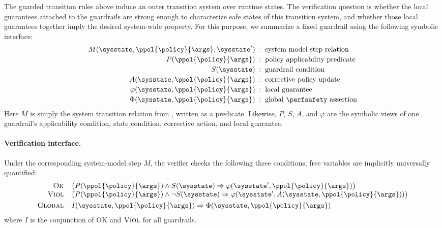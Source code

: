 The guarded transition rules above induce an outer transition system over runtime states.
The verification question is whether the local guarantees attached to the guardrails are strong enough to characterize safe states of this transition system, and whether those local guarantees together imply the desired system-wide property.
For this purpose, we summarize a fixed guardrail using the following symbolic interface:
\[
\begin{array}{r@{\;\;:\;\;}l}
M(\sysstate,\ppol{\policy}{\args},\sysstate') & \text{system model step relation} \\[0.2em]
P(\ppol{\policy}{\args}) & \text{policy applicability predicate} \\[0.2em]
S(\sysstate) & \text{guardrail condition} \\[0.2em]
A(\sysstate,\ppol{\policy}{\args}) & \text{corrective policy update} \\[0.2em]
\varphi(\sysstate,\ppol{\policy}{\args}) & \text{local guarantee} \\[0.2em]
\Phi(\sysstate,\ppol{\policy}{\args}) & \text{global \perfsafety assertion}
\end{array}
\]
Here $M$ is simply the system transition relation from , written as a predicate.
Likewise, $P$, $S$, $A$, and $\varphi$ are the symbolic views of one guardrail's applicability condition, state condition, corrective action, and local guarantee.

\paragraph{Verification interface.}
Under the corresponding system-model step $M$, the verifier checks the following three conditions; free variables are implicitly universally quantified:
\[
\begin{array}{r@{\;\;\;\;}l}
\textsc{Ok} & 
\bigl(P(\ppol{\policy}{\args}) \land S(\sysstate) \Rightarrow \varphi(\sysstate',\ppol{\policy}{\args})\bigr)\\
\textsc{Viol} & \bigl(P(\ppol{\policy}{\args}) \land \neg S(\sysstate) \Rightarrow \varphi(\sysstate',A(\sysstate,\ppol{\policy}{\args}))\bigr) \\[0.4em]
\textsc{Global} & I(\sysstate,\ppol{\policy}{\args}) \Rightarrow \Phi(\sysstate,\ppol{\policy}{\args})
\end{array}
\]
where $I$ is the conjunction of \textsc{OK} and $\textsc{Viol}$ for all guardrails.

